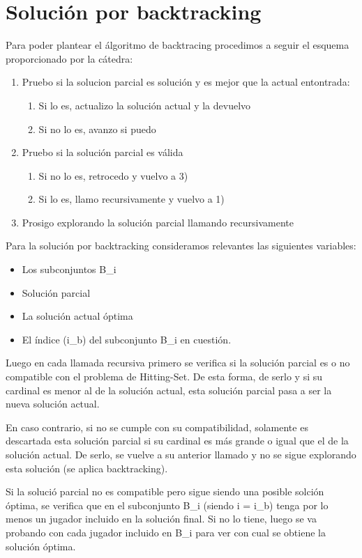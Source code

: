 \section{Solución por backtracking}

Para poder plantear el álgoritmo de backtracing procedimos a seguir el esquema proporcionado por la cátedra:
\begin{enumerate}
    \item Pruebo si la solucion parcial es solución y es mejor que la actual entontrada:
    \begin {enumerate}
        \item Si lo es, actualizo la solución actual y la devuelvo
        \item Si no lo es, avanzo si puedo
    \end{enumerate}
    \item Pruebo si la solución parcial es válida
    \begin {enumerate}
        \item Si no lo es, retrocedo y vuelvo a 3)
        \item Si lo es, llamo recursivamente y vuelvo a 1)
    \end{enumerate}
    \item Prosigo explorando la solución parcial llamando recursivamente
\end{enumerate}

Para la solución por backtracking consideramos relevantes las siguientes variables:
\begin{itemize}
    \item Los subconjuntos B_i
    \item Solución parcial
    \item La solución actual óptima 
    \item El índice (i_b) del subconjunto B_i en cuestión. 
\end{itemize}

Luego en cada llamada recursiva primero se verifica si la solución parcial es o no compatible con el problema de Hitting-Set. De esta forma, de serlo y si su cardinal es menor al de la solución actual, esta solución parcial pasa a ser la nueva solución actual. 

En caso contrario, si no se cumple con su compatibilidad, solamente es descartada esta solución parcial si su cardinal es más grande o igual que el de la solución actual. De serlo, se vuelve a su anterior llamado y no se sigue explorando esta solución (se aplica backtracking).

Si la solució parcial no es compatible pero sigue siendo una posible solción óptima, se verifica que en el subconjunto B_i (siendo i = i_b) tenga por lo menos un jugador incluido en la solución final. Si no lo tiene, luego se va probando con cada jugador incluido en B_i para ver con cual se obtiene la solución óptima.   